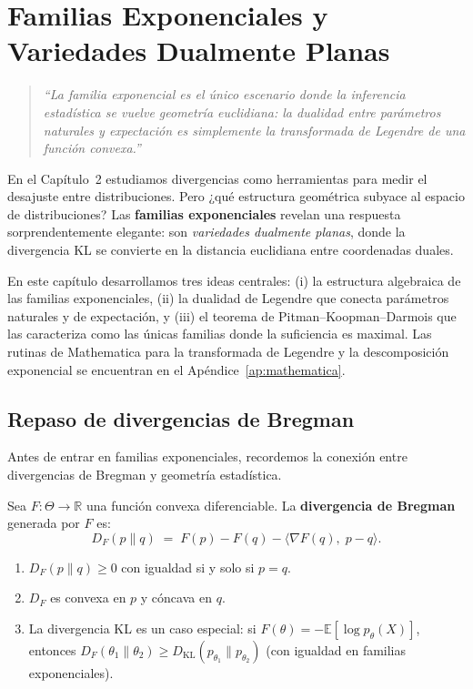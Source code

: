 
\chapter{Familias Exponenciales y Variedades Dualmente Planas}

\begin{quotation}
	\itshape
	``La familia exponencial es el único escenario donde la inferencia estadística se vuelve geometría euclidiana: la dualidad entre parámetros naturales y expectación es simplemente la transformada de Legendre de una función convexa.''
\end{quotation}

En el Capítulo~2 estudiamos divergencias como herramientas para medir el desajuste entre distribuciones.  Pero ¿qué estructura geométrica subyace al espacio de distribuciones?  Las \textbf{familias exponenciales} revelan una respuesta sorprendentemente elegante: son \emph{variedades dualmente planas}, donde la divergencia KL se convierte en la distancia euclidiana entre coordenadas duales.

En este capítulo desarrollamos tres ideas centrales: (i) la estructura algebraica de las familias exponenciales, (ii) la dualidad de Legendre que conecta parámetros naturales y de expectación, y (iii) el teorema de Pitman--Koopman--Darmois que las caracteriza como las únicas familias donde la suficiencia es maximal.  Las rutinas de Mathematica para la transformada de Legendre y la descomposición exponencial se encuentran en el Apéndice~\ref{ap:mathematica}.

\section{Repaso de divergencias de Bregman}

Antes de entrar en familias exponenciales, recordemos la conexión entre divergencias de Bregman y geometría estadística.

\begin{definition}
	Sea $F: \Theta \to \mathbb{R}$ una función convexa diferenciable.  La \textbf{divergencia de Bregman} generada por $F$ es:
	\[
	D_F(p \| q) \;=\; F(p) - F(q) - \langle \nabla F(q),\; p - q \rangle.
	\]
\end{definition}

\begin{proposition}
	\begin{enumerate}
		\item $D_F(p \| q) \ge 0$ con igualdad si y solo si $p = q$.
		\item $D_F$ es convexa en $p$ y cóncava en $q$.
		\item La divergencia KL es un caso especial: si $F(\theta) = -\mathbb{E}[\log p_\theta(X)]$, entonces $D_F(\theta_1 \| \theta_2) \ge D_{\mathrm{KL}}(p_{\theta_1} \| p_{\theta_2})$ (con igualdad en familias exponenciales).
	\end{enumerate}
\end{proposition}

